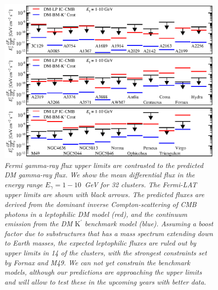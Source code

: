 \documentclass[10pt,aps,pra,reprint,amsmath,amsfonts,amssymb,showpacs,nofootinbib,floatfix]{revtex4-1}
\newcommand{\rmn}{\mathrm}
\newcommand{\Kp}{\rmn{K}^\prime}
\begin{document}
\begin{figure}
\begin{minipage}{2.0\columnwidth}
  \includegraphics[width=0.99\columnwidth]{figures/Fermi.comp.DM.eps}
  \caption{\it Fermi gamma-ray flux upper limits are contrasted to the predicted DM
    gamma-ray flux. We show the mean differential flux in the energy range
    $E_\gamma=1-10$~GeV for 32 clusters. The Fermi-LAT upper limits are shown
    with black arrows. The predicted fluxes are derived from the dominant
    inverse Compton-scattering of CMB photons in a leptophilic DM model (red),
    and the continuum emission from the DM $\Kp$ benchmark model
    (blue). Assuming a boost factor due to substructures that has a mass
    spectrum extending down to Earth masses, the expected leptophilic fluxes are
    ruled out by upper limits in 14 of the clusters, with the strongest
    constraints set by Fornax and M49. We can not yet constrain the benchmark
    models, although our predictions are approaching the upper limits and will
    allow to test these in the upcoming years with better data.}
 \label{fig14}
\end{minipage}
\end{figure}
\end{document}
